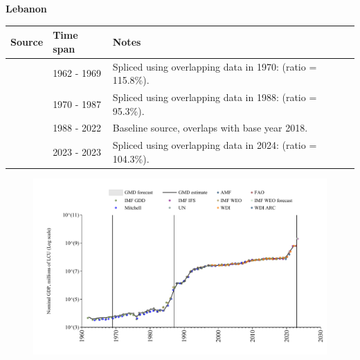 \documentclass[12pt,a4paper,landscape]{article}
\begin{document}
\begin{adjustbox}{max totalsize={\paperwidth}{\paperheight},center}
\begin{minipage}[t][\textheight][t]{\textwidth}
\vspace*{0.5cm}
{}
\begin{center}
{\Large\bfseries Lebanon}
\end{center}
\vspace{0.5cm}
\begin{table}[H]
\centering
\small
\begin{tabular}{|l|l|l|}
\hline
\textbf{Source} & \textbf{Time span} & \textbf{Notes} \\
\hline
\rowcolor{white}\cite{IMF_GDD}& 1962 - 1969 &Spliced using overlapping data in 1970: (ratio = 115.8\%).\\
\rowcolor{lightgray}\cite{UN}& 1970 - 1987 &Spliced using overlapping data in 1988: (ratio = 95.3\%).\\
\rowcolor{white}\cite{WDI}& 1988 - 2022 &Baseline source, overlaps with base year 2018.\\
\rowcolor{lightgray}\cite{FAO}& 2023 - 2023 &Spliced using overlapping data in 2024: (ratio = 104.3\%).\\
\hline
\end{tabular}
\end{table}
\begin{figure}[H]
\centering
\includegraphics[width=\textwidth,height=0.6\textheight,keepaspectratio]{graphs/LBN_nGDP.pdf}
\end{figure}
\end{minipage}
\end{adjustbox}
\end{document}
